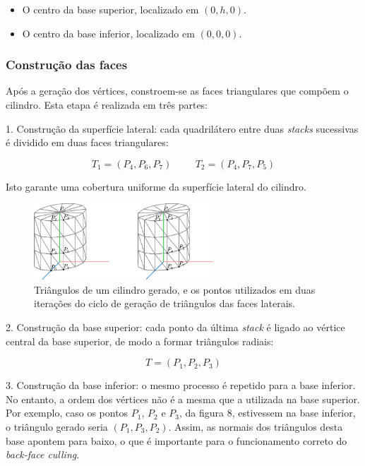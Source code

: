 \documentclass[12pt, a4paper]{article}
\begin{document}
\begin{itemize}
    \item O centro da base superior, localizado em $(0, h, 0)$.
    \item O centro da base inferior, localizado em $(0, 0, 0)$.
\end{itemize}

\subsubsection{Construção das faces}

Após a geração dos vértices, constroem-se as faces triangulares que compõem o cilindro. Esta etapa
é realizada em três partes:

1. Construção da superfície lateral: cada quadrilátero entre duas \emph{stacks} sucessivas é
dividido em duas faces triangulares:

$$
T_1 = (P_4, P_6, P_7)
\hspace{1cm}
T_2 = (P_4, P_7, P_5)
$$

Isto garante uma cobertura uniforme da superfície lateral do cilindro.

\begin{figure}[H]
    \centering
    \includegraphics[width=0.6\textwidth]{res/figures/cylinder.pdf}
    \caption{
        \onehalfspacing
        Triângulos de um cilindro gerado, e os pontos utilizados em duas iterações do ciclo de
        geração de triângulos das faces laterais.
    }
\end{figure}

2. Construção da base superior: cada ponto da última \emph{stack} é ligado ao vértice central da
base superior, de modo a formar triângulos radiais:

$$
T = (P_1, P_2, P_3)
$$

3. Construção da base inferior: o mesmo processo é repetido para a base inferior. No entanto, a
ordem dos vértices não é a mesma que a utilizada na base superior. Por exemplo, caso os pontos
$P_1$, $P_2$ e $P_3$, da figura 8, estivessem na base inferior, o triângulo gerado seria
$(P_1, P_3, P_2)$. Assim, as normais dos triângulos desta base apontem para baixo, o que é
importante para o funcionamento correto do \emph{back-face culling}.
\end{document}
